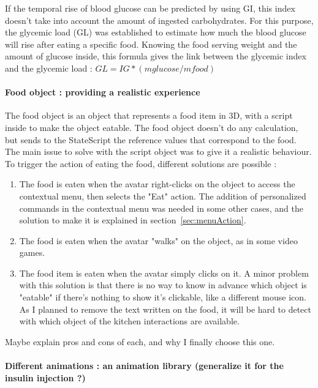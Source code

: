 If the temporal rise of blood glucose can be predicted by using GI, this index doesn't take into account the amount of ingested carbohydrates. For this purpose, the glycemic load (GL) was established to estimate how much the blood glucose will rise after eating a specific food. Knowing the food serving weight and the amount of glucose inside, this formula gives the link between the glycemic index and the glycemic load : $GL = IG * (mglucose/mfood)$
\\

\paragraph{Food object : providing a realistic experience}
\label{sec:food}
The food object is an object that represents a food item in 3D, with a script inside to make the object eatable. The food object doesn't do any calculation, but sends to the StateScript the reference values that correspond to the food. The main issue to solve with the script object was to give it a realistic behaviour. 
\\

To trigger the action of eating the food, different solutions are possible : 
\begin{enumerate}
\item The food is eaten when the avatar right-clicks on the object to access the contextual menu, then selects the "Eat" action. The addition of personalized commands in the contextual menu was needed in some other cases, and the solution to make it is explained in section~\ref{sec:menuAction}. 
\item The food is eaten when the avatar "walks" on the object, as in some video games.
\item The food item is eaten when the avatar simply clicks on it. A minor problem with this solution is that there is no way to know in advance which object is "eatable" if there's nothing to show it's clickable, like a different mouse icon. As I planned to remove the text written on the food, it will be hard to detect with which object of the kitchen interactions are available.
\end{enumerate}
Maybe explain pros and cons of each, and why I finally choose this one. %

\paragraph{Different animations : an animation library (generalize it for the insulin injection ?)}
\label{sec:animLib}

